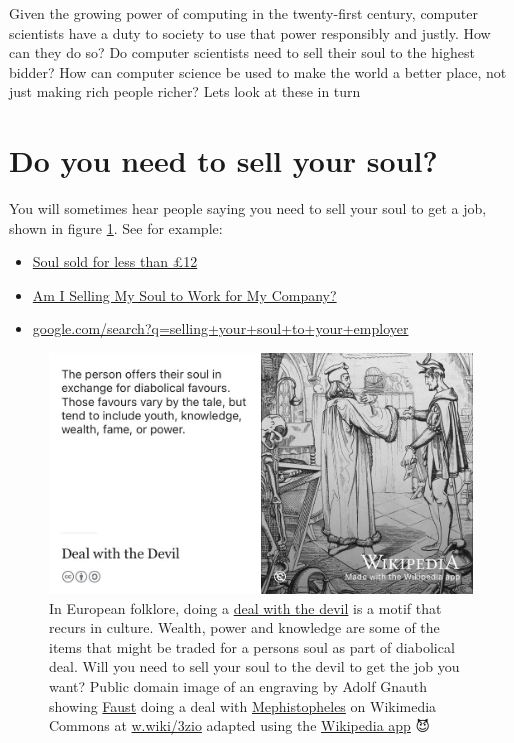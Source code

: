 \documentclass[
]{book}
\providecommand{\tightlist}{%
  \setlength{\itemsep}{0pt}\setlength{\parskip}{0pt}}
\begin{document}
Given the growing power of computing in the twenty-first century, computer scientists have a duty to society to use that power responsibly and justly. How can they do so? Do computer scientists need to sell their soul to the highest bidder? How can computer science be used to make the world a better place, not just making rich people richer? Lets look at these in turn

\hypertarget{soul}{%
\section{Do you need to sell your soul?}\label{soul}}

You will sometimes hear people saying you need to sell your soul to get a job, shown in figure \ref{fig:diabolical-fig}. See for example:

\begin{itemize}
\tightlist
\item
  \href{http://news.bbc.co.uk/1/hi/england/2051061.stm}{Soul sold for less than £12} \citep{bbcsoul}
\item
  \href{https://www.thevectorimpact.com/selling-your-soul/}{Am I Selling My Soul to Work for My Company?} \citep{sellmysoul}
\item
  \href{https://www.google.com/search?q=selling+your+soul+to+your+employer}{google.com/search?q=selling+your+soul+to+your+employer}
\end{itemize}

\begin{figure}

{\centering \includegraphics[width=1\linewidth]{images/deal-with-the-devil} 

}

\caption{In European folklore, doing a \href{https://en.wikipedia.org/wiki/Deal_with_the_Devil}{deal with the devil} is a motif that recurs in culture. Wealth, power and knowledge are some of the items that might be traded for a persons soul as part of diabolical deal. Will you need to sell your soul to the devil to get the job you want? Public domain image of an engraving by Adolf Gnauth showing \href{https://en.wikipedia.org/wiki/Faust}{Faust} doing a deal with \href{https://en.wikipedia.org/wiki/Mephistopheles}{Mephistopheles} on Wikimedia Commons at \href{https://w.wiki/3zio}{w.wiki/3zio} adapted using the \href{https://apps.apple.com/gb/app/wikipedia/id324715238}{Wikipedia app} 😈}\label{fig:diabolical-fig}
\end{figure}
\end{document}
